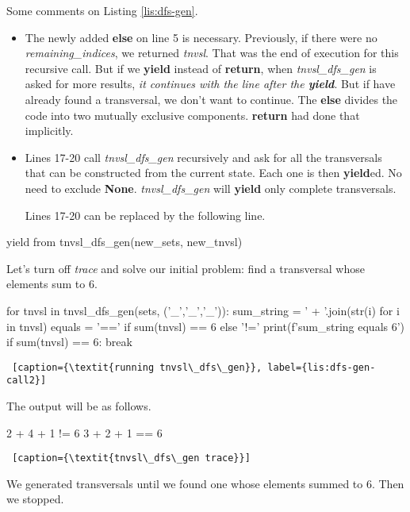Some comments on Listing \ref{lis:dfs-gen}.  %
\begin{itemize}
    \item The newly added \textbf{else} on line 5 is necessary. Previously, if there were no \textit{remaining\_indices}, we returned \textit{tnvsl}. That was the end of execution for this recursive call. But if we \textbf{yield} instead of \textbf{return}, when \textit{tnvsl\_dfs\_gen} is asked for more results, \textit{it continues with the line after the \textbf{yield}}. But if have already found a transversal, we don't want to continue. The \textbf{else} divides the code into two mutually exclusive components. \textbf{return} had done that implicitly.
    
    \item Lines 17-20 call \textit{tnvsl\_dfs\_gen} recursively and ask for all the transversals that can be constructed from the current state. Each one is then \textbf{yield}ed. No need to exclude \textbf{None}.  \textit{tnvsl\_dfs\_gen} will \textbf{yield} only complete transversals. 
    
    \smallv
Lines 17-20 can be replaced by the following line.
\end{itemize}
\begin{center}
\begin{minipage}[c]{0.45\textwidth}
\begin{python1}
    yield from tnvsl_dfs_gen(new_sets, new_tnvsl)
\end{python1}
\end{minipage}   
\end{center}

Let's turn off \textit{trace} and solve our initial problem: find a transversal whose elements sum to 6.

\begin{center}
\begin{minipage}[c]{0.45\textwidth}
\begin{python1}
for tnvsl in tnvsl_dfs_gen(sets, ('_','_','_')):
  sum_string = ' + '.join(str(i) for i in tnvsl)
  equals = '==' if sum(tnvsl) == 6 else '!='
  print(f'{sum_string} {equals} 6')
  if sum(tnvsl) == 6: break
\end{python1}\linv
\begin{lstlisting} [caption={\textit{running tnvsl\_dfs\_gen}}, label={lis:dfs-gen-call2}]
\end{lstlisting}
\end{minipage}
\end{center}

The output will be as follows.
\begin{center}
\begin{minipage}[c]{0.45\textwidth}
\begin{python1}  
    2 + 4 + 1 != 6
    3 + 2 + 1 == 6
\end{python1}\linv
\begin{lstlisting} [caption={\textit{tnvsl\_dfs\_gen trace}}]
\end{lstlisting}
\end{minipage}
\end{center}
We generated transversals until we found one whose elements summed to 6. Then we stopped.
